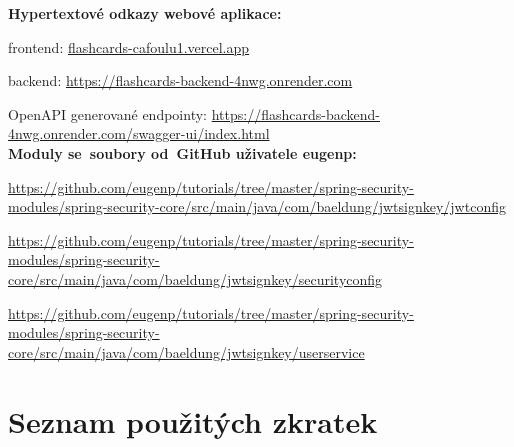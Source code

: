\documentclass[twoside]{ctuthesis}
\begin{document}
\noindent \textbf{Hypertextové odkazy webové aplikace:}

frontend: \url{flashcards-cafoulu1.vercel.app}

backend: \url{https://flashcards-backend-4nwg.onrender.com}

OpenAPI generované endpointy: \url{https://flashcards-backend-4nwg.onrender.com/swagger-ui/index.html} \\

\noindent \textbf{Moduly se~soubory od~GitHub uživatele eugenp:}

\url{https://github.com/eugenp/tutorials/tree/master/spring-security-modules/spring-security-core/src/main/java/com/baeldung/jwtsignkey/jwtconfig}

\url{https://github.com/eugenp/tutorials/tree/master/spring-security-modules/spring-security-core/src/main/java/com/baeldung/jwtsignkey/securityconfig}

\url{https://github.com/eugenp/tutorials/tree/master/spring-security-modules/spring-security-core/src/main/java/com/baeldung/jwtsignkey/userservice}

\appendix

\chapter{Seznam použitých zkratek}
\end{document}
